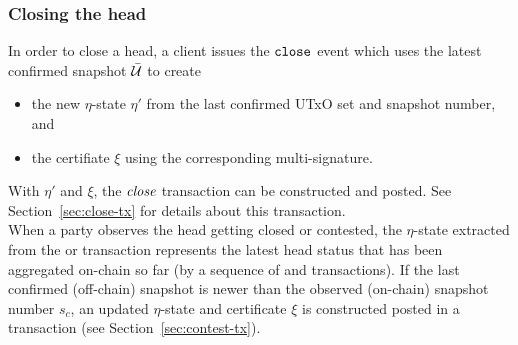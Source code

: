 \subsubsection{Closing the head}

\quad In order to close a head, a client issues the
$\mathtt{close}$ event which uses the latest confirmed snapshot $\bar {\mathcal U}$ to create
\begin{itemize}
  \item the new $\eta$-state $\eta'$ from the last confirmed UTxO set and snapshot
        number, and
  \item the certifiate $\xi$ using the corresponding multi-signature.
\end{itemize}
With $\eta'$ and $\xi$, the $\textit{close}$ transaction can be constructed and
posted. See Section~\ref{sec:close-tx} for details about this transaction. \\

\quad When a party observes
the head getting closed or contested, the $\eta$-state extracted from the
\mtxClose{} or \mtxContest{} transaction represents the latest head status that
has been aggregated on-chain so far (by a sequence of \mtxClose{} and
\mtxContest{} transactions). If the last confirmed (off-chain) snapshot is newer
than the observed (on-chain) snapshot number $s_{c}$, an updated $\eta$-state
and certificate $\xi$ is constructed posted in a \mtxContest{} transaction (see
Section~\ref{sec:contest-tx}).



